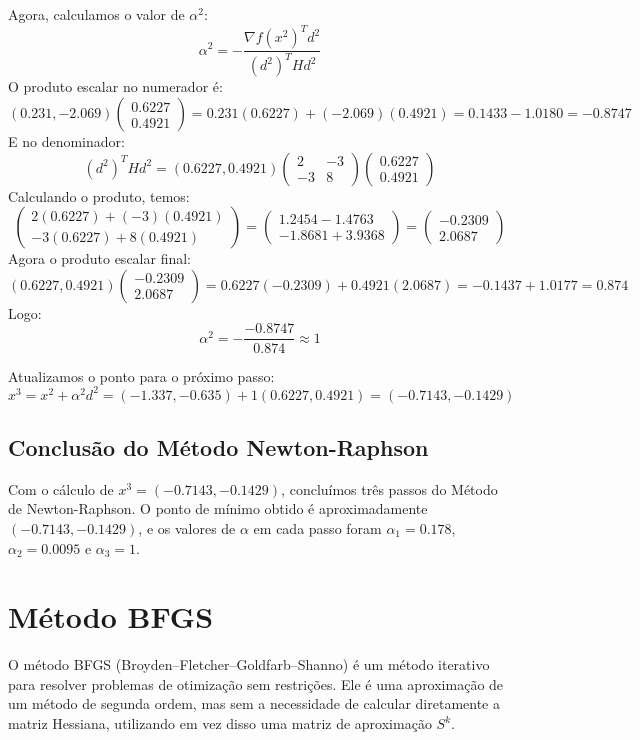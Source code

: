 \documentclass[a4paper, 12pt]{article}
\begin{document}
Agora, calculamos o valor de \( \alpha^2 \):
\[
\alpha^2 = -\frac{\nabla f(x^2)^T d^2}{(d^2)^T H d^2}
\]
O produto escalar no numerador é:
\[
(0.231, -2.069) \begin{pmatrix} 0.6227 \\ 0.4921 \end{pmatrix} = 0.231(0.6227) + (-2.069)(0.4921) = 0.1433 - 1.0180 = -0.8747
\]
E no denominador:
\[
(d^2)^T H d^2 = (0.6227, 0.4921) \begin{pmatrix} 2 & -3 \\ -3 & 8 \end{pmatrix} \begin{pmatrix} 0.6227 \\ 0.4921 \end{pmatrix}
\]
Calculando o produto, temos:
\[
\begin{pmatrix} 2(0.6227) + (-3)(0.4921) \\ -3(0.6227) + 8(0.4921) \end{pmatrix} = \begin{pmatrix} 1.2454 - 1.4763 \\ -1.8681 + 3.9368 \end{pmatrix} = \begin{pmatrix} -0.2309 \\ 2.0687 \end{pmatrix}
\]
Agora o produto escalar final:
\[
(0.6227, 0.4921) \begin{pmatrix} -0.2309 \\ 2.0687 \end{pmatrix} = 0.6227(-0.2309) + 0.4921(2.0687) = -0.1437 + 1.0177 = 0.874
\]
Logo:
\[
\alpha^2 = -\frac{-0.8747}{0.874} \approx 1
\]

Atualizamos o ponto para o próximo passo:
\[
x^3 = x^2 + \alpha^2 d^2 = (-1.337, -0.635) + 1(0.6227, 0.4921) = (-0.7143, -0.1429)
\]

\subsection{Conclusão do Método Newton-Raphson}
Com o cálculo de \( x^3 = (-0.7143, -0.1429) \), concluímos três passos do Método de Newton-Raphson. O ponto de mínimo obtido é aproximadamente \( (-0.7143, -0.1429) \), e os valores de \( \alpha \) em cada passo foram \( \alpha_1 = 0.178 \), \( \alpha_2 = 0.0095 \) e \( \alpha_3 = 1 \).\\


\section{Método BFGS}
O método BFGS (Broyden–Fletcher–Goldfarb–Shanno) é um método iterativo para resolver problemas de otimização sem restrições. Ele é uma aproximação de um método de segunda ordem, mas sem a necessidade de calcular diretamente a matriz Hessiana, utilizando em vez disso uma matriz de aproximação \( S^k \).
\end{document}
